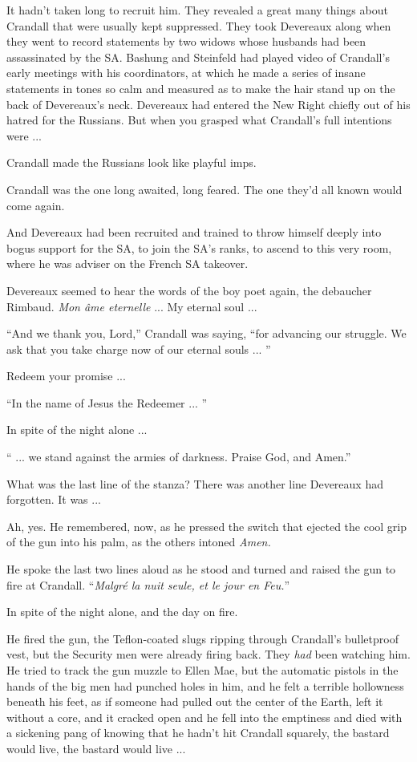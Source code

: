 It hadn't taken long to recruit him. They revealed a great many things about Crandall that were usually kept suppressed. They took Devereaux along when they went to record statements by two widows whose husbands had been assassinated by the SA. Bashung and Steinfeld had played video of Crandall's early meetings with his coordinators, at which he made a series of insane statements in tones so calm and measured as to make the hair stand up on the back of Devereaux's neck. Devereaux had entered the New Right chiefly out of his hatred for the Russians. But when you grasped what Crandall's full intentions were ...

Crandall made the Russians look like playful imps.

Crandall was the one long awaited, long feared. The one they'd all known would come again.

And Devereaux had been recruited and trained to throw himself deeply into bogus support for the SA, to join the SA's ranks, to ascend to this very room, where he was adviser on the French SA takeover.

Devereaux seemed to hear the words of the boy poet again, the debaucher Rimbaud. \textit{Mon âme eternelle} ... My eternal soul ...

``And we thank you, Lord,'' Crandall was saying, ``for advancing our struggle. We ask that you take charge now of our eternal souls ... ''

Redeem your promise ...

``In the name of Jesus the Redeemer ... ''

In spite of the night alone ...

`` ... we stand against the armies of darkness. Praise God, and Amen.''

What was the last line of the stanza? There was another line Devereaux had forgotten. It was ...

Ah, yes. He remembered, now, as he pressed the switch that ejected the cool grip of the gun into his palm, as the others intoned \textit{Amen.}

He spoke the last two lines aloud as he stood and turned and raised the gun to fire at Crandall. ``\textit{Malgré la nuit seule, et le jour en Feu.}''

In spite of the night alone, and the day on fire.

He fired the gun, the Teflon-coated slugs ripping through Crandall's bulletproof vest, but the Security men were already firing back. They \textit{had} been watching him. He tried to track the gun muzzle to Ellen Mae, but the automatic pistols in the hands of the big men had punched holes in him, and he felt a terrible hollowness beneath his feet, as if someone had pulled out the center of the Earth, left it without a core, and it cracked open and he fell into the emptiness and died with a sickening pang of knowing that he hadn't hit Crandall squarely, the bastard would live, the bastard would live ...

